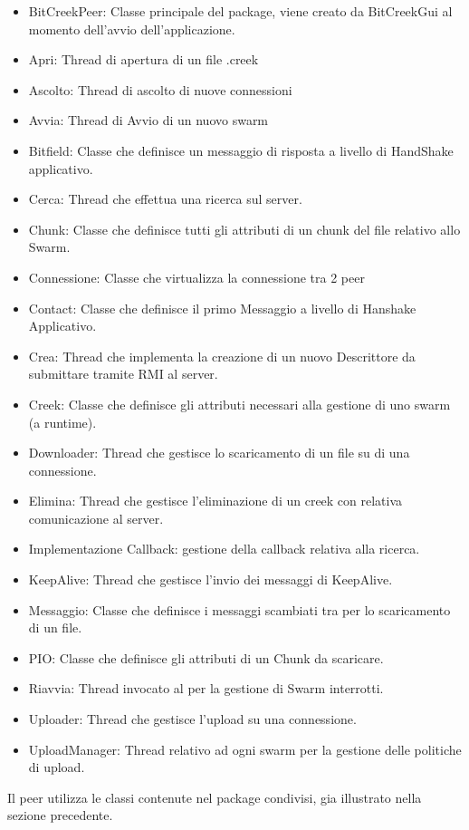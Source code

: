 \begin{itemize}
\item BitCreekPeer: Classe principale del package, viene creato da BitCreekGui al momento dell'avvio dell'applicazione.
\item Apri: Thread di apertura di un file .creek
\item Ascolto: Thread di ascolto di nuove connessioni
\item Avvia: Thread di Avvio di un nuovo swarm
\item Bitfield: Classe che definisce un messaggio di risposta a livello di HandShake applicativo.
\item Cerca: Thread che effettua una ricerca sul server.
\item Chunk: Classe che definisce tutti gli attributi di un chunk del file relativo allo Swarm.
\item Connessione: Classe che virtualizza la connessione tra 2 peer
\item Contact: Classe che definisce il primo Messaggio a livello di Hanshake Applicativo.
\item Crea: Thread che implementa la creazione di un nuovo Descrittore da submittare tramite RMI al server.
\item Creek: Classe che definisce gli attributi necessari alla gestione di uno swarm (a runtime).
\item Downloader: Thread che gestisce lo scaricamento di un file su di una connessione.
\item Elimina: Thread che gestisce l'eliminazione di un creek con relativa comunicazione al server.
\item Implementazione Callback: gestione della callback relativa alla ricerca.
\item KeepAlive: Thread che gestisce l'invio dei messaggi di KeepAlive.
\item Messaggio: Classe che definisce i messaggi scambiati tra per lo scaricamento di un file.
\item PIO: Classe che definisce gli attributi di un Chunk da scaricare.
\item Riavvia: Thread invocato al per la gestione di Swarm interrotti.
\item Uploader: Thread che gestisce l'upload su una connessione.
\item UploadManager: Thread relativo ad ogni swarm per la gestione delle politiche di upload.
\end{itemize}

Il peer utilizza le classi contenute nel package condivisi, gia illustrato nella sezione precedente.


